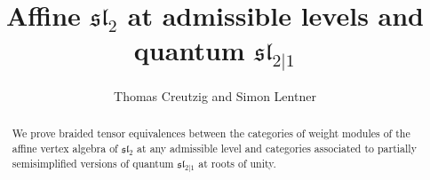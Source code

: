 \documentclass[a4paper, reqno]{amsart}
\title{Affine $\mathfrak{sl}_2$ at admissible levels and  quantum $\mathfrak{sl}_{2|1}$}
\author{Thomas Creutzig and Simon Lentner}
\theoremstyle{introTheorems}
\newcommand\cV{\mathcal{V}}
\newcommand\cW{\mathcal{W}}
\newcommand{\gr}{\textup{gr}}
\newcommand\id{\textup{id}}
\newcommand{\Pic}{\textup{Pic}}
\newcommand\Rep{\textup{Rep}}
\newcommand\Hom{\textup{Hom}}
\renewcommand\sl{\mathfrak{sl}}
\newcommand\Vir{\textup{Vir}}
\newcommand\loc{\textup{loc}}
\newcommand\g\gamma
\renewcommand{\1}{\mathbbold{1}}
\begin{document}
\begin{abstract}
We prove braided tensor equivalences between the categories of weight modules of the affine vertex algebra of $\mathfrak{sl}_2$ at any admissible level and categories associated to partially semisimplified versions of quantum $\mathfrak{sl}_{2|1}$ at roots of unity.
\end{abstract}

\maketitle

\newcommand{\catC}{\mathcal{C}}
\newcommand{\catB}{\mathcal{B}}
\newcommand{\catD}{\mathcal{D}}
\newcommand{\catZ}{\mathcal{Z}}



\newcommand{\C}{\mathbb{C}}
\newcommand{\Z}{\mathbb{Z}}


\newcommand{\Nichols}{H}
\newcommand{\NicholsOf}{\mathfrak{B}}

\newcommand{\YD}{\mathcal{YD}}

\renewcommand{\i}{\mathrm{i}}
\newcommand{\Comod}{\mathrm{Comod}}
\renewcommand{\split}{\mathrm{split}}
\renewcommand{\H}{\mathrm{H}} %
\newcommand{\Laugwitz}{\mathbb{V}} \newcommand{\coLaugwitz}{\mathrm{co}\mathbb{V}}

\newcommand{\NicholsAlgebraCounit}{\varepsilon}

\newcommand{\R}{\mathbb{R}}
\newcommand{\h}{\mathfrak{h}}
\renewcommand{\k}{\mathsf{k}}
\newcommand{\VirPhi}{L^\k}
\renewcommand{\g}{\mathfrak{g}}
\renewcommand{\sl}{\mathfrak{sl}}
\newcommand{\Uq}{\mathrm{U}_q}
\newcommand{\slhat}{\smash{\widehat{\sl}}}

\renewcommand{\YD}[1]{{^{#1}_{#1}}\mathcal{YD}}


\newcommand{\integral}{\Lambda}
\newcommand{\ellNichols}{\mathsf{a}}
\newcommand{\lambdaNichols}{\alpha}
\newcommand{\tillhere}{\newpage --------------- {\bf till here}}


\newcommand{\ra}{\mathrm{ra}}
\newcommand{\la}{\mathrm{la}}
\newcommand{\Fra}{{G}}

\newcommand{\Split}{\mathrm{split}}
\newcommand{\compare}{\mathrm{comp}}
\newcommand{\Schauenburg}{\mathcal{Sch}}
\end{document}
